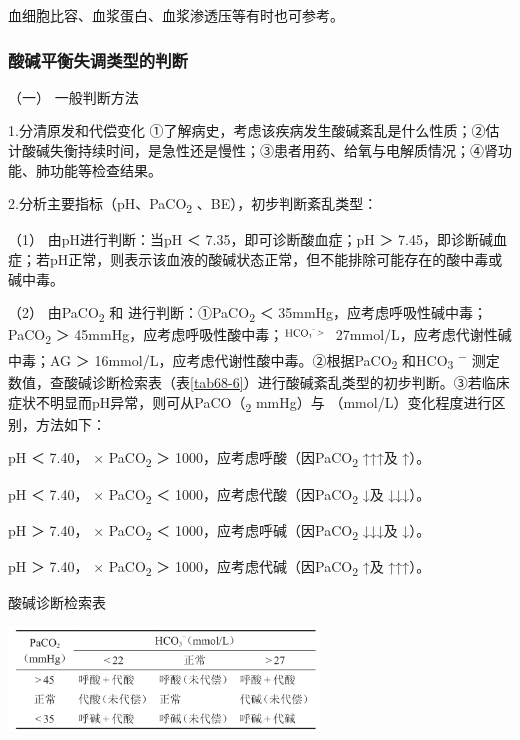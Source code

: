 血细胞比容、血浆蛋白、血浆渗透压等有时也可参考。

\subsubsection{酸碱平衡失调类型的判断}

\hypertarget{text00209.htmlux5cux23CHP6-5-8-2-1}{}
（一） 一般判断方法

1.分清原发和代偿变化
①了解病史，考虑该疾病发生酸碱紊乱是什么性质；②估计酸碱失衡持续时间，是急性还是慢性；③患者用药、给氧与电解质情况；④肾功能、肺功能等检查结果。

2.分析主要指标（pH、PaCO\textsubscript{2} 、BE），初步判断紊乱类型：

（1） 由pH进行判断：当pH ＜ 7.35，即可诊断酸血症；pH ＞
7.45，即诊断碱血症；若pH正常，则表示该血液的酸碱状态正常，但不能排除可能存在的酸中毒或碱中毒。

（2） 由PaCO\textsubscript{2} 和{} 进行判断：①PaCO\textsubscript{2} ＜
35mmHg，应考虑呼吸性碱中毒；PaCO\textsubscript{2} ＞
45mmHg，应考虑呼吸性酸中毒；\includegraphics[width=0.5in,height=0.11458in]{./images/Image00340.jpg}
27mmol/L，应考虑代谢性碱中毒；AG ＞
16mmol/L，应考虑代谢性酸中毒。②根据PaCO\textsubscript{2}
和HCO\textsubscript{3} \textsuperscript{−}
测定数值，查酸碱诊断检索表（表\ref{tab68-6}）进行酸碱紊乱类型的初步判断。③若临床症状不明显而pH异常，则可从PaCO（\textsubscript{2}
mmHg）与{} （mmol/L）变化程度进行区别，方法如下：

pH ＜ 7.40，{} × PaCO\textsubscript{2} ＞
1000，应考虑呼酸（因PaCO\textsubscript{2} ↑↑↑及{} ↑）。

pH ＜ 7.40，{} × PaCO\textsubscript{2} ＜
1000，应考虑代酸（因PaCO\textsubscript{2} ↓及{} ↓↓↓）。

pH ＞ 7.40，{} × PaCO\textsubscript{2} ＜
1000，应考虑呼碱（因PaCO\textsubscript{2} ↓↓↓及{} ↓）。

pH ＞ 7.40，{} × PaCO\textsubscript{2} ＞
1000，应考虑代碱（因PaCO\textsubscript{2} ↑及{} ↑↑↑）。

\begin{table}[htbp]
\centering
\caption{酸碱诊断检索表}
\label{tab68-6}
\includegraphics[width=3.26042in,height=1.09375in]{./images/Image00350.jpg}
\end{table}

